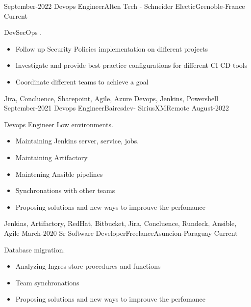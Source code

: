 %
%
%
\begin{experiences}
  \experience
  {September-2022} {Devops Engineer}{Alten Tech - Schneider Electic}{Grenoble-France}
  {Current} {DevSecOps .
                    \begin{itemize}
                        \item Follow up Security Policies implementation on different projects
                        \item Investigate and provide best practice configurations for different CI CD tools
                        \item Coordinate different teams to achieve a goal
                     \end{itemize}
                }
                    {Jira, Concluence, Sharepoint, Agile, Azure Devops, Jenkins, Powershell}
  \experience
  {September-2021} {Devops Engineer}{Bairesdev- SiriusXM}{Remote}
  {August-2022  } {Devops Engineer Low environments.
                    \begin{itemize}
                        \item Maintaining Jenkins server, service, jobs. 
                        \item Maintaining Artifactory
                        \item Maintening Ansible pipelines
                        \item Synchronations with other teams
                        \item Proposing solutions and new ways to improuve the perfomance
                     \end{itemize}
                }
                    {Jenkins, Artifactory, RedHat, Bitbucket, Jira, Concluence, Rundeck, Ansible, Agile}
 \emptySeparator
 \experience
    {March-2020} {Sr Software Developer}{Freelance}{Asuncion-Paraguay}
    {Current} {Database migration.
                      \begin{itemize}
                          \item Analyzing Ingres store procedures and functions
                          \item Team synchronations
                          \item Proposing solutions and new ways to improuve the perfomance

\end{itemize}}
\end{experiences}
